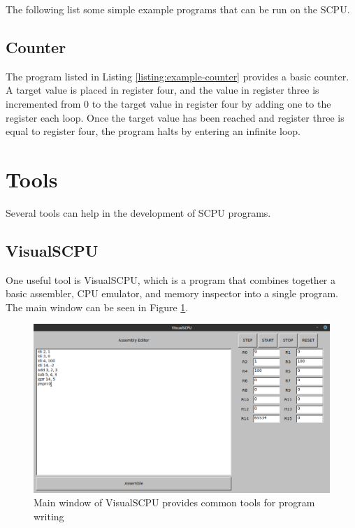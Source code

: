 \documentclass{article}
\begin{document}
The following list some simple example programs that can be run on the SCPU.

\subsection{Counter}

The program listed in Listing \ref{listing:example-counter} provides a basic counter. A target value is placed in register four, and the value in register three is incremented from 0 to the target value in register four by adding one to the register each loop. Once the target value has been reached and register three is equal to register four, the program halts by entering an infinite loop.



\pagebreak

\section{Tools}

Several tools can help in the development of SCPU programs.

\subsection{VisualSCPU}

One useful tool is VisualSCPU, which is a program that combines together a basic assembler, CPU emulator, and memory inspector into a single program. The main window can be seen in Figure \ref{fig:visual-scpu-main-page}.

\begin{figure}[h!]
	\centering
	\includegraphics[width=5in]{images/visual-scpu.png}
	\caption{Main window of VisualSCPU provides common tools for program writing}
	\label{fig:visual-scpu-main-page}
\end{figure}
	
\end{document}
